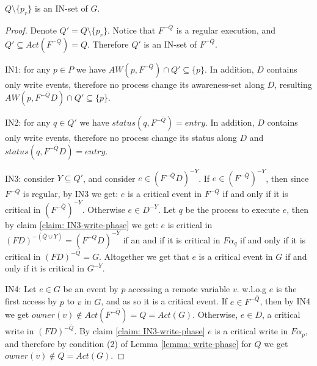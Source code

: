 \begin{claim-subsection}
	$Q \setminus \{p_r\}$ is an IN-set of $G$.
\end{claim-subsection}

\begin{proof}
	Denote $Q' = Q \setminus \{p_r\}$. Notice that $F^{-\overline{Q}}$ is a regular execution, and $Q' \subseteq Act(F^{-\overline{Q}}) = Q$. Therefore $Q'$ is an IN-set of $F^{-\overline{Q}}$.
	
	IN1: for any $p \in P$ we have $AW(p,F^{-\overline{Q}}) \cap Q' \subseteq \{p\}$. In addition, $D$ contains only write events, therefore no process change its awareness-set along $D$, resulting $AW(p,F^{-\overline{Q}} D) \cap Q' \subseteq \{p\}$.
	
	IN2: for any $q \in Q'$ we have $status(q,F^{-\overline{Q}}) = entry$.  In addition, $D$ contains only write events, therefore no process change its status along $D$ and $status(q,F^{-\overline{Q}} D) = entry$.
	
	IN3: consider $Y \subseteq Q'$, and consider $e \in (F^{-\overline{Q}} D)^{-Y}$. If $e \in (F^{-\overline{Q}})^{-Y}$, then since $F^{-\overline{Q}}$ is regular, by IN3 we get: $e$ is a critical event in $F^{-\overline{Q}}$ if and only if it is critical in $(F^{-\overline{Q}})^{-Y}$. Otherwise $e \in D^{-Y}$. Let $q$ be the process to execute $e$, then by claim \ref{claim: IN3-write-phase} we get: $e$ is critical in $(F D)^{-(\overline{Q} \cup Y)} = (F^{-\overline{Q}} D)^{-Y}$ if an and if it is critical in $F \alpha_q$ if and only if it is critical in $(F D)^{-\overline{Q}} = G$.
	Altogether we get that $e$ is a critical event in $G$ if and only if it is critical in $G^{-Y}$.
	
	IN4: Let $e \in G$ be an event by $p$ accessing a remote variable $v$. w.l.o.g $e$ is the first access by $p$ to $v$ in $G$, and as so it is a critical event. If $e \in F^{-\overline{Q}}$, then by IN4 we get $owner(v) \notin Act(F^{-\overline{Q}}) = Q =Act(G)$. Otherwise, $e \in D$, a critical write in $(F D)^{-\overline{Q}}$. By claim \ref{claim: IN3-write-phase} $e$ is a critical write in $F \alpha_p$, and therefore by condition (2) of Lemma \ref{lemma: write-phase} for $Q$ we get $owner(v) \notin Q = Act(G)$.
	

\end{proof}
